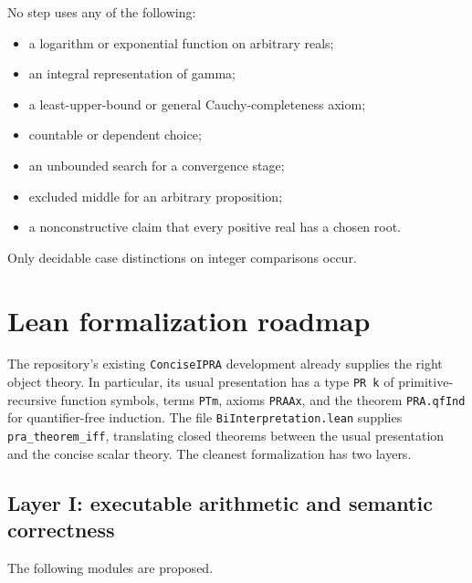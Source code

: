 \documentclass[11pt]{article}
\newcommand{\code}[1]{\texttt{#1}}
\begin{document}
No step uses any of the following:
\begin{itemize}[leftmargin=2em]
\item a logarithm or exponential function on arbitrary reals;
\item an integral representation of gamma;
\item a least-upper-bound or general Cauchy-completeness axiom;
\item countable or dependent choice;
\item an unbounded search for a convergence stage;
\item excluded middle for an arbitrary proposition;
\item a nonconstructive claim that every positive real has a chosen root.
\end{itemize}
Only decidable case distinctions on integer comparisons occur.

\section{Lean formalization roadmap}
\label{sec:lean}

The repository's existing \code{ConciseIPRA} development already supplies the
right object theory.  In particular, its usual presentation has a type
\code{PR k} of primitive-recursive function symbols, terms \code{PTm}, axioms
\code{PRAAx}, and the theorem \code{PRA.qfInd} for quantifier-free induction.
The file \code{BiInterpretation.lean} supplies
\code{pra\_theorem\_iff}, translating closed theorems between the usual
presentation and the concise scalar theory.  The cleanest formalization has
two layers.

\subsection{Layer I: executable arithmetic and semantic correctness}

The following modules are proposed.
\end{document}
